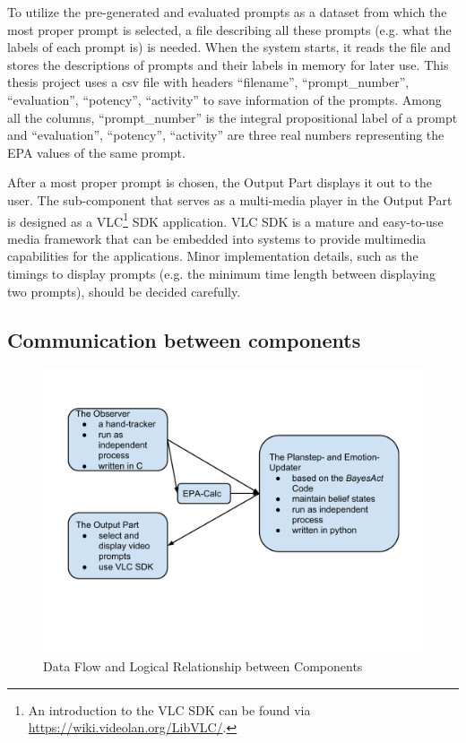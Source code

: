 To utilize the pre-generated and evaluated prompts as a dataset from which the most proper prompt is selected, a file describing all these prompts (e.g. what the labels of each prompt is) is needed. When the system starts, it reads the file and stores the descriptions of prompts and their labels in memory for later use. This thesis project uses a csv file with headers ``filename'', ``prompt\_number'', ``evaluation'', ``potency'', ``activity'' to save information of the prompts. Among all the columns, ``prompt\_number'' is the integral propositional label of a prompt and ``evaluation'', ``potency'', ``activity'' are three real numbers representing the EPA values of the same prompt. 

After a most proper prompt is chosen, the Output Part displays it out to the user. The sub-component that serves as a multi-media player in the Output Part is designed as a VLC\footnote{An introduction to the VLC SDK can be found via \url{https://wiki.videolan.org/LibVLC/}.} SDK application. VLC SDK is a mature and easy-to-use media framework that can be embedded into systems to provide multimedia capabilities for the applications. Minor implementation details, such as the timings to display prompts (e.g. the minimum time length between displaying two prompts), should be decided carefully.

\subsection{Communication between components}

\begin{figure}[p]
\centering
\includegraphics[width=\linewidth]{fig-dataflow.pdf}
\caption{Data Flow and Logical Relationship between Components}
\label{fig:dataflow}
\end{figure}

